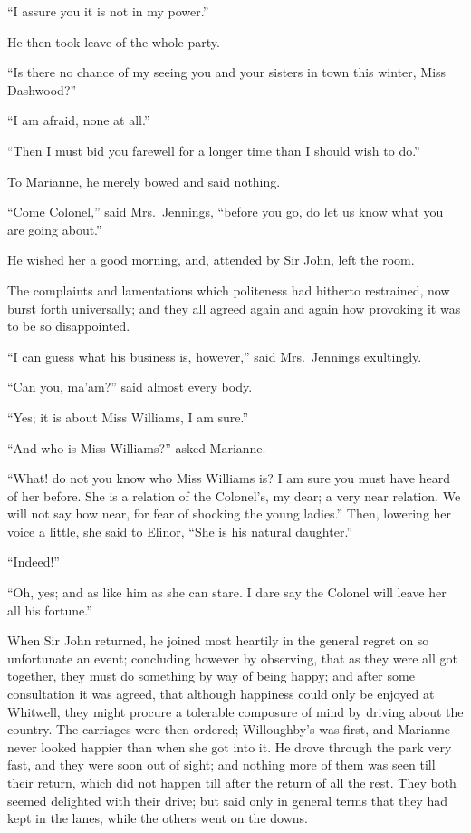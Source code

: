 \documentclass{article}
\begin{document}
``I assure you it is not in my power.''

He then took leave of the whole party.

``Is there no chance of my seeing you and your sisters
in town this winter, Miss Dashwood?''

``I am afraid, none at all.''

``Then I must bid you farewell for a longer time
than I should wish to do.''

To Marianne, he merely bowed and said nothing.

``Come Colonel,'' said Mrs.\ Jennings, ``before you go,
do let us know what you are going about.''

He wished her a good morning, and, attended by Sir John,
left the room.

The complaints and lamentations which politeness
had hitherto restrained, now burst forth universally;
and they all agreed again and again how provoking it was
to be so disappointed.

``I can guess what his business is, however,''
said Mrs.\ Jennings exultingly.

``Can you, ma'am?'' said almost every body.

``Yes; it is about Miss Williams, I am sure.''

``And who is Miss Williams?'' asked Marianne.

``What! do not you know who Miss Williams is? I am
sure you must have heard of her before.  She is a relation
of the Colonel's, my dear; a very near relation.  We will
not say how near, for fear of shocking the young ladies.''
Then, lowering her voice a little, she said to Elinor,
``She is his natural daughter.''

``Indeed!''

``Oh, yes; and as like him as she can stare.
I dare say the Colonel will leave her all his fortune.''

When Sir John returned, he joined most heartily
in the general regret on so unfortunate an event;
concluding however by observing, that as they were
all got together, they must do something by way of
being happy; and after some consultation it was agreed,
that although happiness could only be enjoyed at Whitwell,
they might procure a tolerable composure of mind by driving
about the country.  The carriages were then ordered;
Willoughby's was first, and Marianne never looked
happier than when she got into it.  He drove through
the park very fast, and they were soon out of sight;
and nothing more of them was seen till their return,
which did not happen till after the return of all the rest.
They both seemed delighted with their drive; but said
only in general terms that they had kept in the lanes,
while the others went on the downs.
\end{document}
